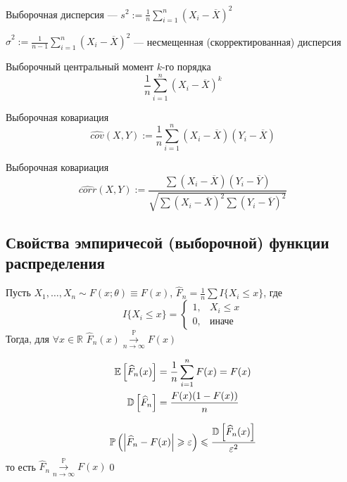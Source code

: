 \documentclass[a4paper, 10pt]{article}
\begin{document}
 Выборочная дисперсия — $s^2:=\displaystyle\frac{1}{n}\sum_{i=1}^{n}(X_i-\overline{X})^2$

 $\widehat{\sigma}^2:=\displaystyle\frac{1}{n-1}\sum_{i=1}^n (X_i-\overline{X})^2$ — несмещенная (скорректированная) дисперсия

 Выборочный центральный момент $k$-го порядка
\begin{equation*}
    \frac{1}{n}\sum_{i=1}^n(X_i-\overline{X})^k
\end{equation*}

 Выборочная ковариация
\begin{equation*}
    \widehat{cov}(X,Y):=\frac{1}{n}\sum_{i=1}^{n}(X_i-\overline{X})(Y_i-\overline{X})
\end{equation*}

 Выборочная ковариация
\begin{equation*}
    \widehat{corr}(X,Y):=\frac{\sum (X_i-\overline{X})(Y_i-\overline{Y})}{\sqrt{\sum (X_i-\overline{X})^2\sum (Y_i-\overline{Y})^2}}
\end{equation*}

\subsection{Свойства эмпиричесой (выборочной) функции распределения}
\theorem Пусть $X_1,\ldots,X_n\sim F(x;\theta)\equiv F(x)$, $\widehat{F}_n=\displaystyle\frac{1}{n}\sum I\{X_i\leqslant x\}$, где
\begin{equation*}
    I\{X_i\leqslant x\}=\begin{cases}
        1,&X_i\leqslant x\\
        0,&\text{иначе}
    \end{cases}
\end{equation*}
Тогда, для $\forall x\in\mathbb{R}$ $\widehat{F}_n(x)\overset{\mathbb{P}}{\underset{n\to\infty}{\longrightarrow}}F(x)$

\proof 
\begin{equation*}
    \begin{aligned}
        \matwait{\widehat{F}_n(x)}&=\frac{1}{n}\sum_{i=1}^{n}F(x)=F(x)\\
        \dispersia{\widehat{F}_n}&=\frac{F(x)(1-F(x))}{n}
    \end{aligned}
\end{equation*}

\begin{equation*}
    \mathbb{P}\left(\left|\widehat{F}_n-F(x)\right|\geqslant\varepsilon\right)\leqslant\frac{\mathbb{D}\left[\widehat{F}_n(x)\right]}{\varepsilon^2}
\end{equation*}
то есть $\widehat{F}_n\overset{\mathbb{P}}{\underset{n\to\infty}{\longrightarrow}}F(x)$\qed
\end{document}
